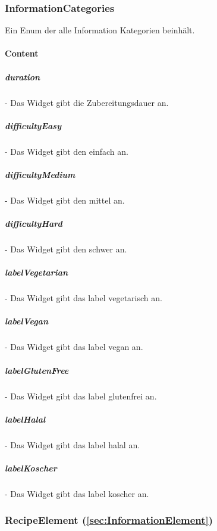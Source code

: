 \documentclass[parskip=full]{scrartcl}
\begin{document}
    \subsubsection{InformationCategories} \label{sec:InformationCategories}
        Ein Enum der alle Information Kategorien beinhält.
        \paragraph*{Content}
            \subparagraph*{duration} - Das Widget gibt die Zubereitungsdauer an.
            \subparagraph*{difficultyEasy} - Das Widget gibt den  einfach an.
            \subparagraph*{difficultyMedium} - Das Widget gibt den  mittel an.
            \subparagraph*{difficultyHard} - Das Widget gibt den  schwer an.
            \subparagraph*{labelVegetarian} - Das Widget gibt das \gls{label} vegetarisch an.
            \subparagraph*{labelVegan} - Das Widget gibt das \gls{label} vegan an.
            \subparagraph*{labelGlutenFree} - Das Widget gibt das \gls{label} glutenfrei an.
            \subparagraph*{labelHalal} - Das Widget gibt das \gls{label} halal an.
            \subparagraph*{labelKoscher} - Das Widget gibt das \gls{label} koscher an.

    \subsubsection*{RecipeElement (\autoref{sec:InformationElement})}
\end{document}

